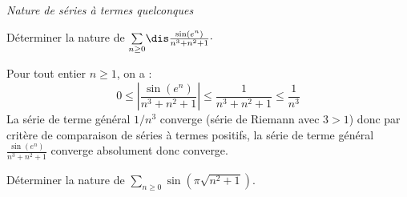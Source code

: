 \documentclass[a4paper,10pt]{report}
\newcommand{\Sum}[2]{\ensuremath{\textstyle{\sum\limits_{#1}^{#2}}}}
\begin{document}
\medskip

\begin{center}
\textit{{ {\large Nature de séries à termes quelconques}}}
\end{center}

\medskip

\begin{Exercice}{} Déterminer la nature de $\Sum{n \geq 0}{} \dis\frac{\sin(e^n)}{n^3+n^2+1} \cdot$
\end{Exercice}

\corr Pour tout entier $n \geq 1$, on a :
\begin{equation}\label{ineg1}
0 \leq \left\vert \frac{\sin(e^n)}{n^3+n^2+1} \right\vert \leq \frac{1}{n^3+n^2+1} \leq \dfrac{1}{n^3}
\end{equation}
La série de terme général $1/n^3$ converge (série de Riemann avec $3>1$) donc par critère de comparaison de séries à termes positifs, la série de terme général $\frac{\sin(e^n)}{n^3+n^2+1}$ converge absolument donc converge.

\medskip

\begin{Exercice}{} Déterminer la nature de $\Sum{n \geq 0}{} \sin \left({\pi \sqrt {n^2 + 1}} \right)$.
\end{Exercice}
\end{document}
